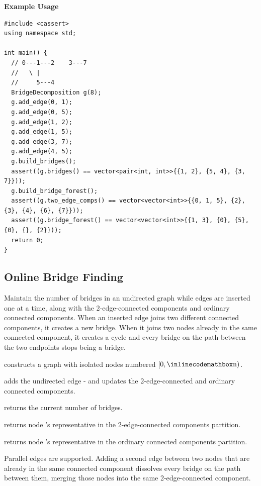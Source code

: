 \textbf{Example Usage}\par
\begin{lstlisting}[style=cpp]
#include <cassert>
using namespace std;

int main() {
  // 0---1---2    3---7
  //   \ |
  //     5---4
  BridgeDecomposition g(8);
  g.add_edge(0, 1);
  g.add_edge(0, 5);
  g.add_edge(1, 2);
  g.add_edge(1, 5);
  g.add_edge(3, 7);
  g.add_edge(4, 5);
  g.build_bridges();
  assert((g.bridges() == vector<pair<int, int>>{{1, 2}, {5, 4}, {3, 7}}));
  g.build_bridge_forest();
  assert((g.two_edge_comps() == vector<vector<int>>{{0, 1, 5}, {2}, {3}, {4}, {6}, {7}}));
  assert((g.bridge_forest() == vector<vector<int>>{{1, 3}, {0}, {5}, {0}, {}, {2}}));
  return 0;
}
\end{lstlisting}
\subsection{Online Bridge Finding}
\label{sec:4.2.7}
Maintain the number of bridges in an undirected graph while edges are inserted one at a time, along with the 2-edge-connected components and ordinary connected components. When an inserted edge joins two different connected components, it creates a new bridge. When it joins two nodes already in the same connected component, it creates a cycle and every bridge on the path between the two endpoints stops being a bridge.

\begin{compactitem}
  \item {} constructs a graph with  isolated nodes numbered $[0, {\inlinecodemath{n}})$.
  \item {} adds the undirected edge - and updates the 2-edge-connected and ordinary connected components.
  \item {} returns the current number of bridges.
  \item {} returns node 's representative in the 2-edge-connected components partition.
  \item {} returns node 's representative in the ordinary connected components partition.
\end{compactitem}

Parallel edges are supported. Adding a second edge between two nodes that are already in the same connected component dissolves every bridge on the path between them, merging those nodes into the same 2-edge-connected component.

